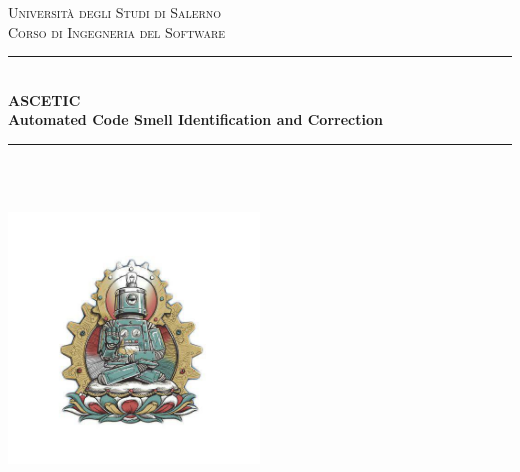 	\begin{titlepage} %
		\newcommand{\HRule}{\rule{\linewidth}{0.5mm}} %
		
		\center %
		
		
		\textsc{\LARGE Università degli Studi di Salerno}\\
		\textsc{\large Corso di Ingegneria del Software}\\[1.5cm] %
		
		
		\HRule\\[0.4cm]
		
		{\huge\bfseries ASCETIC}\\ %
		\vspace{0.2cm}
		{\large\bfseries Automated Code Smell Identification and Correction}\\[0.2cm] %
		
		\HRule\\[1.5cm]
		
		\textsc{\Large \doctitle}\\[0.3cm] %
		
		
		
		
		\vfill\vfill
		
		\includegraphics[width=0.5\textwidth]{../logo_temp.jpg}\\[1cm] %
		

\end{titlepage}
